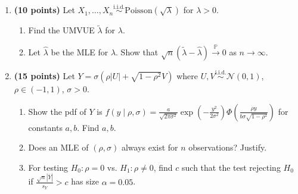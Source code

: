 \documentclass[11pt,a4paper]{article}
\DeclareMathOperator{\Pbb}{\mathbb{P}}
\begin{document}
\begin{enumerate}[label=\textbf{\arabic*.}]
    \item \textbf{(10 points)} Let $X_1, \dots, X_n \stackrel{\text{i.i.d.}}{\sim} \mathrm{Poisson}(\sqrt{\lambda})$ for $\lambda > 0$.
    \begin{enumerate}[label=(\alph*)]
        \item Find the UMVUE $\tilde{\lambda}$ for $\lambda$.
        \item Let $\hat{\lambda}$ be the MLE for $\lambda$. Show that $\sqrt{n}(\tilde{\lambda} - \hat{\lambda}) \xrightarrow{\Pbb} 0$ as $n \to \infty$.
    \end{enumerate}

    \item \textbf{(15 points)} Let $Y = \sigma(\rho |U| + \sqrt{1 - \rho^2} V)$ where $U, V \stackrel{\text{i.i.d.}}{\sim} \mathcal{N}(0, 1)$, $\rho \in (-1, 1)$, $\sigma > 0$.
    \begin{enumerate}[label=(\alph*)]
        \item Show the pdf of $Y$ is $f(y \mid \rho, \sigma) = \frac{a}{\sqrt{2\pi\sigma^2}} \exp\left(-\frac{y^2}{2\sigma^2}\right) \Phi\left(\frac{\rho y}{b\sigma\sqrt{1-\rho^2}}\right)$ for constants $a, b$. Find $a, b$.
        \item Does an MLE of $(\rho, \sigma)$ always exist for $n$ observations? Justify.
        \item For testing $H_0 : \rho = 0$ vs. $H_1 : \rho \neq 0$, find $c$ such that the test rejecting $H_0$ if $\frac{\sqrt{n}|\overline{Y}|}{s_Y} > c$ has size $\alpha = 0.05$.
    \end{enumerate}
\end{enumerate}
\end{document}
